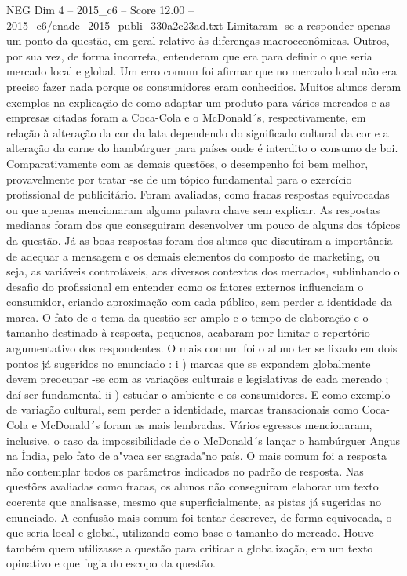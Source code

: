 \begin{textsample}{NEG Dim 4 – 2015\_c6 – Score 12.00 – 2015\_c6/enade\_2015\_publi\_330a2c23ad.txt}
Limitaram -se a responder apenas um ponto da questão, em geral relativo às diferenças macroeconômicas.
Outros, por sua vez, de forma incorreta, entenderam que era para definir o que seria mercado local e global.
Um erro comum foi afirmar que no mercado local não era preciso fazer nada porque os consumidores eram conhecidos.
Muitos alunos deram exemplos na explicação de como adaptar um produto para vários mercados e as empresas citadas foram a Coca-Cola e o McDonald´s, respectivamente, em relação à alteração da cor da lata dependendo do significado cultural da cor e a alteração da carne do hambúrguer para países onde é interdito o consumo de boi.
Comparativamente com as demais questões, o desempenho foi bem melhor, provavelmente por tratar -se de um tópico fundamental para o exercício profissional de publicitário.
Foram avaliadas, como fracas respostas equivocadas ou que apenas mencionaram alguma palavra chave sem explicar.
As respostas medianas foram dos que conseguiram desenvolver um pouco de alguns dos tópicos da questão.
Já as boas respostas foram dos alunos que discutiram a importância de adequar a mensagem e os demais elementos do composto de marketing, ou seja, as variáveis controláveis, aos diversos contextos dos mercados, sublinhando o desafio do profissional em entender como os fatores externos influenciam o consumidor, criando aproximação com cada público, sem perder a identidade da marca.
O fato de o tema da questão ser amplo e o tempo de elaboração e o tamanho destinado à resposta, pequenos, acabaram por limitar o repertório argumentativo dos respondentes.
O mais comum foi o aluno ter se fixado em dois pontos já sugeridos no enunciado : i ) marcas que se expandem globalmente devem preocupar -se com as variações culturais e legislativas de cada mercado ; daí ser fundamental ii ) estudar o ambiente e os consumidores.
E como exemplo de variação cultural, sem perder a identidade, marcas transacionais como Coca-Cola e McDonald´s foram as mais lembradas.
Vários egressos mencionaram, inclusive, o caso da impossibilidade de o McDonald´s lançar o hambúrguer Angus na Índia, pelo fato de a"vaca ser sagrada"no país.
O mais comum foi a resposta não contemplar todos os parâmetros indicados no padrão de resposta.
Nas questões avaliadas como fracas, os alunos não conseguiram elaborar um texto coerente que analisasse, mesmo que superficialmente, as pistas já sugeridas no enunciado.
A confusão mais comum foi tentar descrever, de forma equivocada, o que seria local e global, utilizando como base o tamanho do mercado.
Houve também quem utilizasse a questão para criticar a globalização, em um texto opinativo e que fugia do escopo da questão.

\end{textsample}
